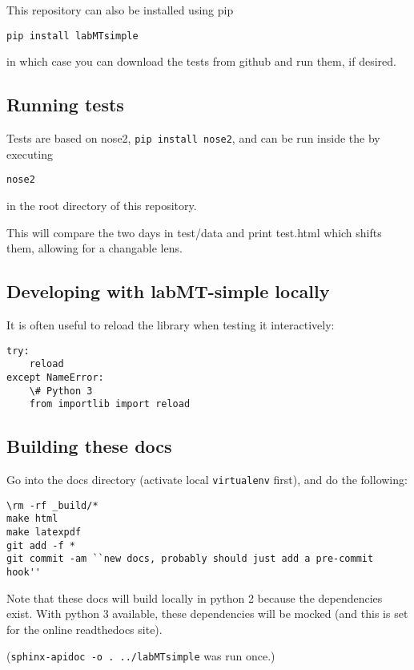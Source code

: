 This repository can also be installed using pip
\begin{lstlisting}
pip install labMTsimple
\end{lstlisting}

in which case you can download the tests from github and run them, if desired.


\subsection{Running tests}
\label{getting-started:running-tests}
Tests are based on nose2, \lstinline{pip install nose2}, and can be run inside the by executing
\begin{lstlisting}
nose2
\end{lstlisting}

in the root directory of this repository.

This will compare the two days in test/data and print test.html which shifts them, allowing for a changable lens.


\subsection{Developing with labMT-simple locally}
\label{getting-started:developing-with-labmt-simple-locally}
It is often useful to reload the library when testing it interactively:
\begin{lstlisting}
try:
    reload
except NameError:
    \# Python 3
    from importlib import reload
\end{lstlisting}


\subsection{Building these docs}
\label{getting-started:building-these-docs}
Go into the docs directory (activate local \lstinline{virtualenv} first), and do the following:
\begin{lstlisting}
\rm -rf _build/*
make html
make latexpdf
git add -f *
git commit -am ``new docs, probably should just add a pre-commit hook''
\end{lstlisting}

Note that these docs will build locally in python 2 because the dependencies exist.
With python 3 available, these dependencies will be mocked (and this is set for the online readthedocs site).

(\lstinline{sphinx-apidoc -o . ../labMTsimple} was run once.)


